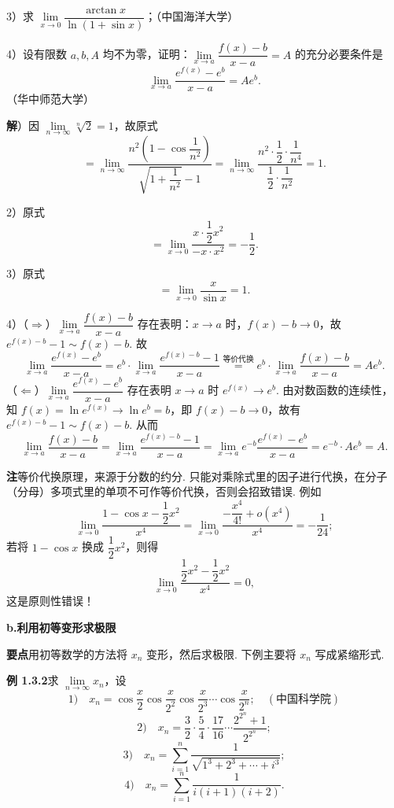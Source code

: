 \documentclass[UTF8, 12pt, fontset=fandol, oneside]{ctexart}
\begin{document}
3）求 $\lim\limits_{x\to0}\dfrac{\arctan x}{\ln(1+\sin x)}$；（中国海洋大学）

4）设有限数 $a,b,A$ 均不为零，证明：$\lim\limits_{x\to a}\dfrac{f(x)-b}{x-a}=A$ 的充分必要条件是
\[
  \lim_{x\to a}\frac{e^{f(x)}-e^b}{x-a}=Ae^b.
\]
（华中师范大学）

\noindent\textbf{解}）因 $\lim\limits_{n\to\infty}\sqrt[n]{2}=1$，故原式
\[
=\lim_{n\to\infty}
\frac{n^2\left(1-\cos\dfrac1{n^2}\right)}
{\sqrt{1+\dfrac1{n^2}}-1}
=\lim_{n\to\infty}
\frac{n^2\cdot\dfrac12\cdot\dfrac1{n^4}}
{\dfrac12\cdot\dfrac1{n^2}}=1.
\]

2）原式
\[
=\lim_{x\to0}\frac{x\cdot\dfrac12x^2}{-x\cdot x^2}=-\frac12.
\]

3）原式
\[
=\lim_{x\to0}\frac{x}{\sin x}=1.
\]

4）（$\Rightarrow$）$\lim\limits_{x\to a}\dfrac{f(x)-b}{x-a}$ 存在表明：$x\to a$ 时，$f(x)-b\to0$，故 $e^{f(x)-b}-1\sim f(x)-b$. 故
\[
\lim_{x\to a}\frac{e^{f(x)}-e^b}{x-a}
=e^b\cdot\lim_{x\to a}\frac{e^{f(x)-b}-1}{x-a}
\stackrel{\text{等价代换}}{=}e^b\cdot\lim_{x\to a}\frac{f(x)-b}{x-a}=Ae^b.
\]
（$\Leftarrow$）$\lim\limits_{x\to a}\dfrac{e^{f(x)}-e^b}{x-a}$ 存在表明 $x\to a$ 时 $e^{f(x)}\to e^b$. 由对数函数的连续性，知 $f(x)=\ln e^{f(x)}\to\ln e^b=b$，即 $f(x)-b\to0$，故有 $e^{f(x)-b}-1\sim f(x)-b$. 从而
\[
\lim_{x\to a}\frac{f(x)-b}{x-a}
=\lim_{x\to a}\frac{e^{f(x)-b}-1}{x-a}
=\lim_{x\to a}e^{-b}\frac{e^{f(x)}-e^b}{x-a}
=e^{-b}\cdot Ae^b=A.
\]

\noindent\textbf{注}\quad 等价代换原理，来源于分数的约分. 只能对乘除式里的因子进行代换，在分子（分母）多项式里的单项不可作等价代换，否则会招致错误. 例如
\[
  \lim_{x\to0}\frac{1-\cos x-\dfrac12x^2}{x^4}
  =
  \lim_{x\to0}\frac{-\dfrac{x^4}{4!}+o(x^4)}{x^4}
  =-\frac1{24};
\]
若将 $1-\cos x$ 换成 $\dfrac12x^2$，则得
\[
  \lim_{x\to0}\frac{\dfrac12x^2-\dfrac12x^2}{x^4}=0,
\]
这是原则性错误！

\noindent\textbf{b.\quad 利用初等变形求极限}

\noindent\textbf{要点}\quad 用初等数学的方法将 $x_n$ 变形，然后求极限. 下例主要将 $x_n$ 写成紧缩形式.

\noindent\textbf{例 1.3.2}\quad 求 $\lim\limits_{n\to\infty}x_n$，设
\[
1)\quad x_n=\cos\frac{x}{2}\cos\frac{x}{2^2}\cos\frac{x}{2^3}\cdots\cos\frac{x}{2^n};\quad(\text{中国科学院})
\]
\[
2)\quad x_n=\frac32\cdot\frac54\cdot\frac{17}{16}\cdots\frac{2^{2^n}+1}{2^{2^n}};
\]
\[
3)\quad x_n=\sum_{i=1}^n\frac1{\sqrt{1^3+2^3+\cdots+i^3}};
\]
\[
4)\quad x_n=\sum_{i=1}^n\frac1{i(i+1)(i+2)}.
\]
\end{document}
